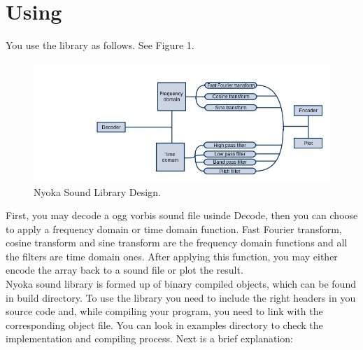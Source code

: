 \documentclass[letterpaper]{article}
\begin{document}
\section{Using}
You use the library as follows. See Figure 1.
\begin{figure}
\centering
\includegraphics[width=1\textwidth]{diagrama_nyoka__1_.jpg}
\caption{\label{fig:libraryFlowDiagram}Nyoka Sound Library Design.}
\end{figure}

	First, you may decode a ogg vorbis sound file usinde Decode, then you can choose to apply a frequency domain or time domain function. Fast Fourier transform, cosine transform and sine transform are the frequency {}domain functions and all the filters are time domain ones. After applying this function, you may either encode the array back to a sound file or plot the result.\\
	Nyoka sound library is formed up of binary compiled objects,
which can be found in build directory. To use the library you need to
include the right headers in you source code and, while compiling your
program, you need to link with the corresponding object file. 
	You can look in examples directory to check the implementation
and compiling process. Next is a brief explanation:
\end{document}
